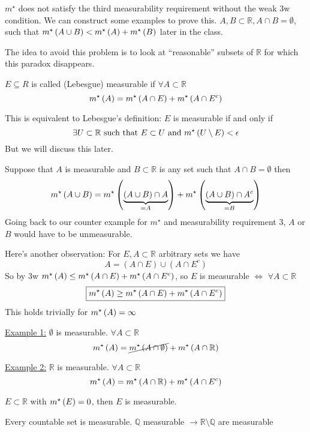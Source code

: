 $m^{\star}$ does not satisfy the third measurability requirement without the weak 3w condition.
We can construct some examples to prove this.
$A, B \subset \mathbb{R}, A \cap B = \emptyset$, such that $m^{\star}\left(A \cup B\right) < m^{\star}\left(A\right) + m^{\star}\left(B\right)$ later in the class.

The idea to avoid this problem is to look at ``reasonable'' subsets of $\mathbb{R}$ for which this paradox disappears.

\begin{definition}
    $E \subseteq R$ is called (Lebesgue) measurable if $\forall A \subset \mathbb{R}$
    \[
        m^{\star}\left(A\right) = m^{\star}\left(A \cap E\right) + m^{\star}\left(A \cap E^c\right)
    \]
\end{definition}
\begin{remark}
    This is equivalent to Lebesgue's definition: $E$ is measurable if and only if
    \[
        \exists U \subset \mathbb{R} \text{ such that } E \subset U \text{ and } m^{\star}\left(U \setminus E\right) < \epsilon
    \]
    But we will discuss this later.
\end{remark}

Suppose that $A$ is measurable and $B \subset \mathbb{R}$ is any set such that $A \cap B = \emptyset$ then
\[
    m^{\star}\left(A \cup B\right) = m^{\star}\left(\underbrace{(A \cup B) \cap A}_{=A}\right) + m^{\star}\left(\underbrace{(A \cup B) \cap A^{c}}_{=B}\right)
\]
Going back to our counter example for $m^{\star}$ and measurability requirement 3, $A$ or $B$ would have to be unmeasurable.

Here's another observation: For $E, A \subset \mathbb{R}$ arbitrary sets we have
\[
    A = (A \cap E) \cup (A \cap E^{c})
\]
So by 3w $m^{\star}\left(A\right) \leq m^{\star}\left(A \cap E\right) + m^{\star}\left(A \cap E^{c}\right)$, so $E$ is measurable $\iff$ $\forall A \subset \mathbb{R}$
\[
    \boxed{m^{\star}\left(A\right) \geq m^{\star}\left(A \cap E\right) + m^{\star}\left(A \cap E^{c}\right)}
\]
This holds trivially for $m^{\star}\left(A\right) = \infty$

\underline{Example 1:} $\emptyset$ is measurable.
$\forall A \subset \mathbb{R}$
\[
    m^{\star}\left(A\right) = \cancel{m^{\star}\left(A \cap \emptyset\right)} + m^{\star}\left(A \cap \mathbb{R}\right)
\]

\underline{Example 2:} $\mathbb{R}$ is measurable.
$\forall A \subset \mathbb{R}$
\[
    m^{\star}\left(A\right) = m^{\star}\left(A \cap \mathbb{R}\right) + m^{\star}\left(A \cap E^{c}\right)
\]

\begin{prop}
    $E \subset \mathbb{R}$ with $m^{\star}\left(E\right) = 0$, then $E$ is measurable.
\end{prop}

\begin{*corollary}
    Every countable set is measurable.
    $\mathbb{Q}$ measurable $\rightarrow \mathbb{R} \setminus \mathbb{Q}$ are measurable
\end{*corollary}

